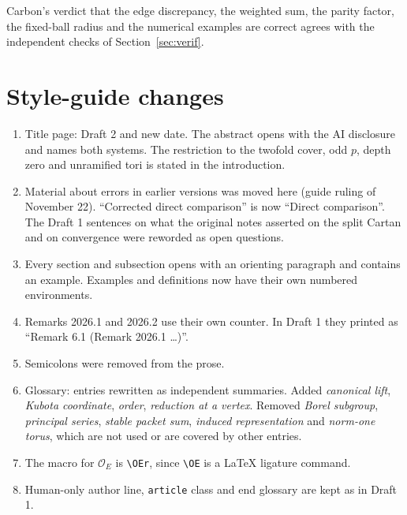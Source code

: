 \documentclass[12pt,letterpaper]{article}
\begin{document}
Carbon's verdict that the edge discrepancy, the weighted sum, the parity factor, the fixed-ball radius and the numerical examples are correct agrees with the independent checks of Section~\ref{sec:verif}.

\section{Style-guide changes}
\begin{enumerate}
\item Title page: Draft 2 and new date. The abstract opens with the AI disclosure and names both systems. The restriction to the twofold cover, odd $p$, depth zero and unramified tori is stated in the introduction.
\item Material about errors in earlier versions was moved here (guide ruling of November 22). ``Corrected direct comparison'' is now ``Direct comparison''. The Draft 1 sentences on what the original notes asserted on the split Cartan and on convergence were reworded as open questions.
\item Every section and subsection opens with an orienting paragraph and contains an example. Examples and definitions now have their own numbered environments.
\item Remarks 2026.1 and 2026.2 use their own counter. In Draft 1 they printed as ``Remark 6.1 (Remark 2026.1 \ldots)''.
\item Semicolons were removed from the prose.
\item Glossary: entries rewritten as independent summaries. Added \emph{canonical lift}, \emph{Kubota coordinate}, \emph{order}, \emph{reduction at a vertex}. Removed \emph{Borel subgroup}, \emph{principal series}, \emph{stable packet sum}, \emph{induced representation} and \emph{norm-one torus}, which are not used or are covered by other entries.
\item The macro for $\mathcal O_E$ is \verb|\OEr|, since \verb|\OE| is a \LaTeX{} ligature command.
\item Human-only author line, \texttt{article} class and end glossary are kept as in Draft 1.
\end{enumerate}
\end{document}
